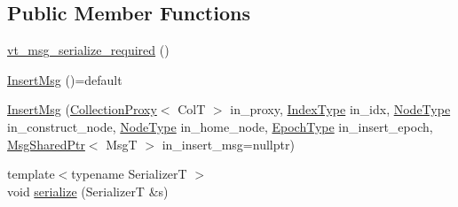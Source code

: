 \subsection*{Public Member Functions}
\begin{DoxyCompactItemize}
\item 
\hyperlink{structvt_1_1vrt_1_1collection_1_1_insert_msg_a8904f76e0a2b435aa26ff923e4118009}{vt\+\_\+msg\+\_\+serialize\+\_\+required} ()
\item 
\hyperlink{structvt_1_1vrt_1_1collection_1_1_insert_msg_a2a1c9b09db00dd3ec8cd54ff994401f7}{Insert\+Msg} ()=default
\item 
\hyperlink{structvt_1_1vrt_1_1collection_1_1_insert_msg_a2df48d0777f98f268beee283f1bbd840}{Insert\+Msg} (\hyperlink{structvt_1_1vrt_1_1collection_1_1_collection_proxy}{Collection\+Proxy}$<$ ColT $>$ in\+\_\+proxy, \hyperlink{structvt_1_1vrt_1_1collection_1_1_insert_msg_a6d0f0e849ba09859a0cda3e4785de16b}{Index\+Type} in\+\_\+idx, \hyperlink{namespacevt_a866da9d0efc19c0a1ce79e9e492f47e2}{Node\+Type} in\+\_\+construct\+\_\+node, \hyperlink{namespacevt_a866da9d0efc19c0a1ce79e9e492f47e2}{Node\+Type} in\+\_\+home\+\_\+node, \hyperlink{namespacevt_a985a5adf291c34a3ca263b3378388236}{Epoch\+Type} in\+\_\+insert\+\_\+epoch, \hyperlink{namespacevt_ab2b3d506ec8e8d1540aede826d84a239}{Msg\+Shared\+Ptr}$<$ MsgT $>$ in\+\_\+insert\+\_\+msg=nullptr)
\item 
{\footnotesize template$<$typename SerializerT $>$ }\\void \hyperlink{structvt_1_1vrt_1_1collection_1_1_insert_msg_ac55e25383969b7d021b68e6062974a6d}{serialize} (SerializerT \&s)
\end{DoxyCompactItemize}
